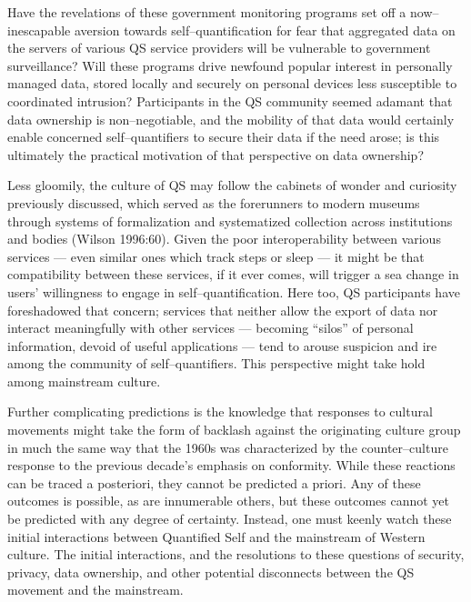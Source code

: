 \documentclass{article}
\begin{document}
Have the revelations of these government monitoring programs set off a now--inescapable aversion towards self--quantification for fear that aggregated data on the servers of various QS service providers will be vulnerable to government surveillance? Will these programs drive newfound popular interest in personally managed data,
stored locally and securely on personal devices less susceptible to coordinated intrusion? Participants in the QS community seemed adamant that data ownership is non--negotiable,
and the mobility of that data would certainly enable concerned self--quantifiers to secure their data if the need arose;
is this ultimately the practical motivation of that perspective on data ownership?

Less gloomily,
the culture of QS may follow the cabinets of wonder and curiosity previously discussed,
which served as the forerunners to modern museums through systems of formalization and systematized collection across institutions and bodies
(Wilson 1996:60). 
Given the poor interoperability between various services
--- even similar ones which track steps or sleep ---
it might be that compatibility between these services,
if it ever comes,
will trigger a sea change in users' willingness to engage in self--quantification.
Here too,
QS participants have foreshadowed that concern;
services that neither allow the export of data nor interact meaningfully with other services
--- becoming ``silos'' of personal information,
devoid of useful applications
--- tend to arouse suspicion and ire among the community of self--quantifiers.
This perspective might take hold among mainstream culture.

Further complicating predictions is the knowledge that responses to cultural movements might take the form of backlash against the originating culture group in much the same way that the 1960s was characterized by the counter--culture response to the previous decade's emphasis on conformity.
While these reactions can be traced a posteriori,
they cannot be predicted a priori.
Any of these outcomes is possible,
as are innumerable others,
but these outcomes cannot yet be predicted with any degree of certainty.
Instead,
one must keenly watch these initial interactions between Quantified Self and the mainstream of Western culture.
The initial interactions,
and the resolutions to these questions of security,
privacy,
data ownership,
and other potential disconnects between the QS movement and the mainstream.
\end{document}
